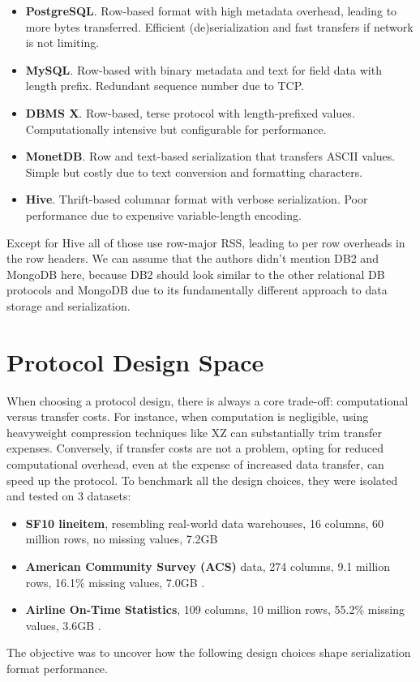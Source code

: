 \documentclass[sigconf]{acmart}
\begin{document}
\begin{itemize}
    \item \textbf{PostgreSQL}.
    Row-based format with high metadata overhead, leading to more bytes transferred. 
    Efficient (de)serialization and fast transfers if network is not limiting.
    
    \item \textbf{MySQL}.
    Row-based with binary metadata and text for field data with length prefix.
    Redundant sequence number due to TCP.
    
    \item \textbf{DBMS X}.
    Row-based, terse protocol with length-prefixed values. 
    Computationally intensive but configurable for performance.
    
    \item \textbf{MonetDB}.
    Row and text-based serialization that transfers ASCII values. 
    Simple but costly due to text conversion and formatting characters.
    
    \item \textbf{Hive}.
    Thrift-based columnar format with verbose serialization. 
    Poor performance due to expensive variable-length encoding.
\end{itemize}


Except for Hive all of those use row-major RSS, leading to per row overheads in the row headers. We can assume that the authors didn't mention DB2 and MongoDB here, because DB2 should look similar to the other relational DB protocols and MongoDB due to its fundamentally different approach to data storage and serialization.


\section{Protocol Design Space}
When choosing a protocol design, there is always a core trade-off: computational versus transfer costs. For instance, when computation is negligible, using heavyweight compression techniques like XZ \cite{salomon2006datacompression} can substantially trim transfer expenses. Conversely, if transfer costs are not a problem, opting for reduced computational overhead, even at the expense of increased data transfer, can speed up the protocol.
To benchmark all the design choices, they were isolated and tested on 3 datasets:
\begin{itemize}
  \item \textbf{SF10 lineitem}, resembling real-world data warehouses, 16 columns, 60 million rows, no missing values, 7.2GB
  \item \textbf{American Community Survey (ACS)} data, 274 columns, 9.1 million rows, 16.1\% missing values, 7.0GB \cite{usc2014americancensus}.
  \item \textbf{Airline On-Time Statistics}, 109 columns, 10 million rows, 55.2\% missing values, 3.6GB \cite{dot2016airlineontime}.
\end{itemize}
The objective was to uncover how the following design choices shape serialization format performance.
\end{document}

